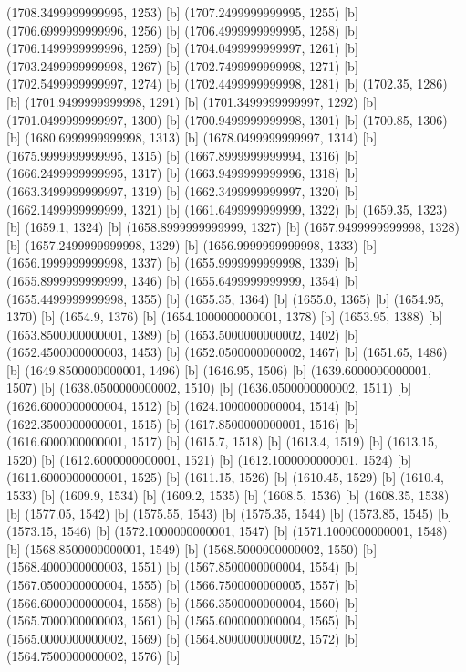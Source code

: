 {{{(1708.3499999999995, 1253) [b] 
(1707.2499999999995, 1255) [b] 
(1706.6999999999996, 1256) [b] 
(1706.4999999999995, 1258) [b] 
(1706.1499999999996, 1259) [b] 
(1704.0499999999997, 1261) [b] 
(1703.2499999999998, 1267) [b] 
(1702.7499999999998, 1271) [b] 
(1702.5499999999997, 1274) [b] 
(1702.4499999999998, 1281) [b] 
(1702.35, 1286) [b] 
(1701.9499999999998, 1291) [b] 
(1701.3499999999997, 1292) [b] 
(1701.0499999999997, 1300) [b] 
(1700.9499999999998, 1301) [b] 
(1700.85, 1306) [b] 
(1680.6999999999998, 1313) [b] 
(1678.0499999999997, 1314) [b] 
(1675.9999999999995, 1315) [b] 
(1667.8999999999994, 1316) [b] 
(1666.2499999999995, 1317) [b] 
(1663.9499999999996, 1318) [b] 
(1663.3499999999997, 1319) [b] 
(1662.3499999999997, 1320) [b] 
(1662.1499999999999, 1321) [b] 
(1661.6499999999999, 1322) [b] 
(1659.35, 1323) [b] 
(1659.1, 1324) [b] 
(1658.8999999999999, 1327) [b] 
(1657.9499999999998, 1328) [b] 
(1657.2499999999998, 1329) [b] 
(1656.9999999999998, 1333) [b] 
(1656.1999999999998, 1337) [b] 
(1655.9999999999998, 1339) [b] 
(1655.8999999999999, 1346) [b] 
(1655.6499999999999, 1354) [b] 
(1655.4499999999998, 1355) [b] 
(1655.35, 1364) [b] 
(1655.0, 1365) [b] 
(1654.95, 1370) [b] 
(1654.9, 1376) [b] 
(1654.1000000000001, 1378) [b] 
(1653.95, 1388) [b] 
(1653.8500000000001, 1389) [b] 
(1653.5000000000002, 1402) [b] 
(1652.4500000000003, 1453) [b] 
(1652.0500000000002, 1467) [b] 
(1651.65, 1486) [b] 
(1649.8500000000001, 1496) [b] 
(1646.95, 1506) [b] 
(1639.6000000000001, 1507) [b] 
(1638.0500000000002, 1510) [b] 
(1636.0500000000002, 1511) [b] 
(1626.6000000000004, 1512) [b] 
(1624.1000000000004, 1514) [b] 
(1622.3500000000001, 1515) [b] 
(1617.8500000000001, 1516) [b] 
(1616.6000000000001, 1517) [b] 
(1615.7, 1518) [b] 
(1613.4, 1519) [b] 
(1613.15, 1520) [b] 
(1612.6000000000001, 1521) [b] 
(1612.1000000000001, 1524) [b] 
(1611.6000000000001, 1525) [b] 
(1611.15, 1526) [b] 
(1610.45, 1529) [b] 
(1610.4, 1533) [b] 
(1609.9, 1534) [b] 
(1609.2, 1535) [b] 
(1608.5, 1536) [b] 
(1608.35, 1538) [b] 
(1577.05, 1542) [b] 
(1575.55, 1543) [b] 
(1575.35, 1544) [b] 
(1573.85, 1545) [b] 
(1573.15, 1546) [b] 
(1572.1000000000001, 1547) [b] 
(1571.1000000000001, 1548) [b] 
(1568.8500000000001, 1549) [b] 
(1568.5000000000002, 1550) [b] 
(1568.4000000000003, 1551) [b] 
(1567.8500000000004, 1554) [b] 
(1567.0500000000004, 1555) [b] 
(1566.7500000000005, 1557) [b] 
(1566.6000000000004, 1558) [b] 
(1566.3500000000004, 1560) [b] 
(1565.7000000000003, 1561) [b] 
(1565.6000000000004, 1565) [b] 
(1565.0000000000002, 1569) [b] 
(1564.8000000000002, 1572) [b] 
(1564.7500000000002, 1576) [b] 
}}}
